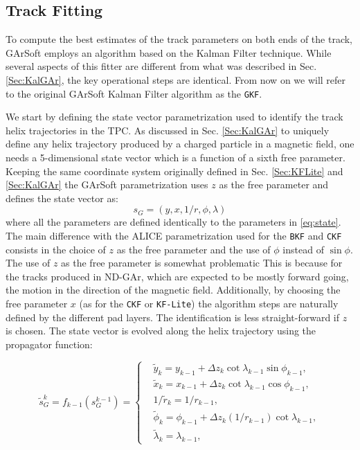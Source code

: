 \subsection{Track Fitting}
\label{Sec:GArSoft_Fit}
To compute the best estimates of the track parameters on both ends of the track, GArSoft employs an algorithm based on the Kalman Filter technique. While several aspects of this fitter are different from what was described in Sec. \ref{Sec:KalGAr}, the key operational steps are identical. From now on we will refer to the original GArSoft Kalman Filter algorithm as the \texttt{GKF}.

We start by defining the state vector parametrization used to identify the track helix trajectories in the TPC. As discussed in Sec. \ref{Sec:KalGAr} to uniquely define any helix trajectory produced by a charged particle in a magnetic field, one needs a 5-dimensional state vector which is a function of a sixth free parameter. Keeping the same coordinate system originally defined in Sec. \ref{Sec:KFLite} and \ref{Sec:KalGAr} the GArSoft parametrization uses $z$ as the free parameter and defines the state vector as:
\begin{equation}
    s_G = (y,x,1/r,\phi,\lambda)
\end{equation}
where all the parameters are defined identically to the parameters in \ref{eq:state}. The main difference with the ALICE parametrization used for the \texttt{BKF} and \texttt{CKF} consists in the choice of $z$ as the free parameter and the use of $\phi$ instead of $\sin{\phi}$. The use of $z$ as the free parameter is somewhat problematic This is because for the tracks produced in ND-GAr, which are expected to be mostly forward going, the motion in the direction of the magnetic field. Additionally, by choosing the free parameter $x$ (as for the \texttt{CKF} or \texttt{KF-Lite}) the algorithm steps are naturally defined by the different pad layers. The identification is less straight-forward if $z$ is chosen. The state vector is evolved along the helix trajectory using the propagator function:

\begin{equation} \label{eq:funcGAr}
    \widetilde{s}_G^k = f_{k-1}(s_G^{k-1}) =
        \left\{
        	\begin{aligned}
        		& \widetilde{y}_k  =  y_{k-1}+  \Delta z_k\cot{\lambda_{k-1}}\sin{\phi_{k-1}},  \\
        		& \widetilde{x}_k  =  x_{k-1}+\Delta z_k\cot{\lambda_{k-1}}\cos{\phi_{k-1}} ,\\ 
                    & 1/\widetilde{r}_k =  1/r_{k-1},  \\               
                    & \widetilde{\phi}_k   =  \phi_{k-1}+\Delta z_k(1/r_{k-1})\cot\lambda_{k-1}, \\   
                    & \widetilde{\lambda}_k = \lambda_{k-1},
        	\end{aligned}
        \right.
\end{equation}

